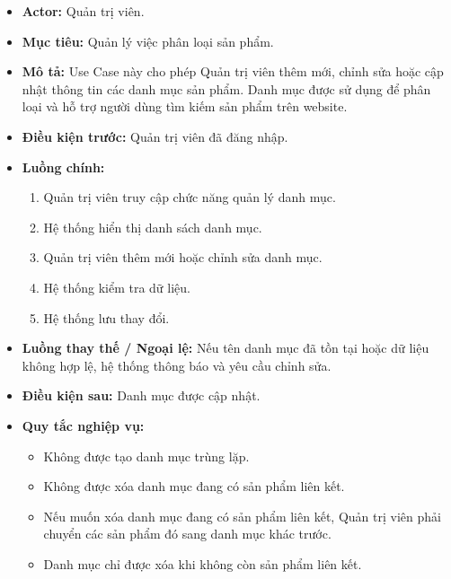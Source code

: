 \documentclass[12pt,a4paper]{article}
\begin{document}
\begin{itemize}

 \item \textbf{Actor:} Quản trị viên.

 \item \textbf{Mục tiêu:} Quản lý việc phân loại sản phẩm.

 \item \textbf{Mô tả:} Use Case này cho phép Quản trị viên thêm mới, chỉnh sửa hoặc cập nhật thông tin các danh mục sản phẩm. Danh mục được sử dụng để phân loại và hỗ trợ người dùng tìm kiếm sản phẩm trên website.

 \item \textbf{Điều kiện trước:} Quản trị viên đã đăng nhập.

 \item \textbf{Luồng chính:}

 \begin{enumerate}

  \item Quản trị viên truy cập chức năng quản lý danh mục.

  \item Hệ thống hiển thị danh sách danh mục.

  \item Quản trị viên thêm mới hoặc chỉnh sửa danh mục.

  \item Hệ thống kiểm tra dữ liệu.

  \item Hệ thống lưu thay đổi.

 \end{enumerate}

 \item \textbf{Luồng thay thế / Ngoại lệ:} Nếu tên danh mục đã tồn tại hoặc dữ liệu không hợp lệ, hệ thống thông báo và yêu cầu chỉnh sửa.

 \item \textbf{Điều kiện sau:} Danh mục được cập nhật.

 \item \textbf{Quy tắc nghiệp vụ:}

 \begin{itemize}

  \item Không được tạo danh mục trùng lặp.

  \item Không được xóa danh mục đang có sản phẩm liên kết.
        \item Nếu muốn xóa danh mục đang có sản phẩm liên kết, Quản trị viên phải chuyển các sản phẩm đó sang danh mục khác trước.
        \item Danh mục chỉ được xóa khi không còn sản phẩm liên kết.

 \end{itemize}

\end{itemize}
\end{document}

